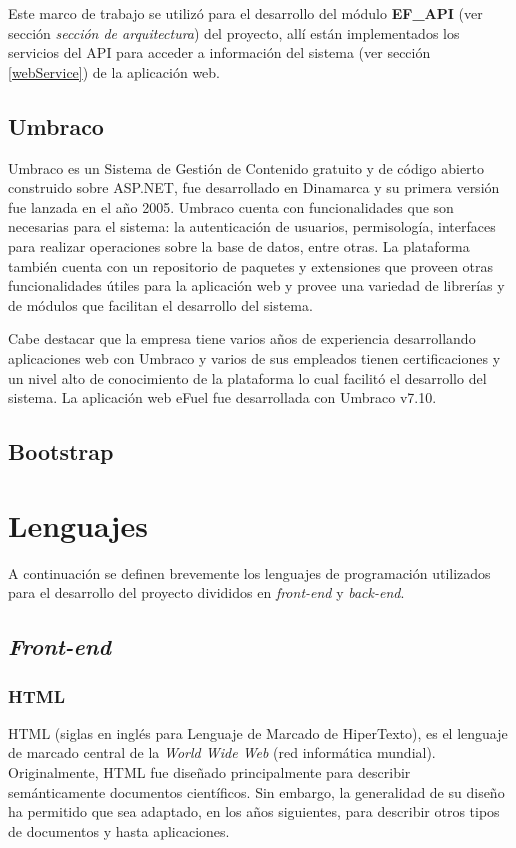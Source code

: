     Este marco de trabajo se utilizó para el desarrollo del módulo \textbf{EF\_API} (ver sección \emph{sección de arquitectura}) del proyecto, allí están implementados los servicios del API para acceder a información del sistema (ver sección \ref{webService}) de la aplicación web.

    \subsection{Umbraco}
    Umbraco es un Sistema de Gestión de Contenido gratuito y de código abierto construido sobre ASP.NET, fue desarrollado en Dinamarca y su primera versión fue lanzada en el año 2005. Umbraco cuenta con funcionalidades que son necesarias para el sistema: la autenticación de usuarios, permisología, interfaces para realizar operaciones sobre la base de datos, entre otras. La plataforma también cuenta con un repositorio de paquetes y extensiones que proveen otras funcionalidades útiles para la aplicación web y provee una variedad de librerías y de módulos que facilitan el desarrollo del sistema.

    Cabe destacar que la empresa tiene varios años de experiencia desarrollando aplicaciones web con Umbraco y varios de sus empleados tienen certificaciones y un nivel alto de conocimiento de la plataforma lo cual facilitó el desarrollo del sistema. La aplicación web eFuel fue desarrollada con Umbraco v7.10.

    \subsection{Bootstrap}


\section{Lenguajes}
A continuación se definen brevemente los lenguajes de programación utilizados para el desarrollo del proyecto divididos en \textit{front-end} y \textit{back-end}.

\subsection{\emph{Front-end}}
\subsubsection{HTML}
HTML (siglas en inglés para Lenguaje de Marcado de HiperTexto), es el lenguaje de marcado central de la \textit{World Wide Web} (red informática mundial). Originalmente, HTML fue diseñado principalmente para describir semánticamente documentos científicos. Sin embargo, la generalidad de su diseño ha permitido que sea adaptado, en los años siguientes, para describir otros tipos de documentos y hasta aplicaciones. \cite{htmlW3C}

